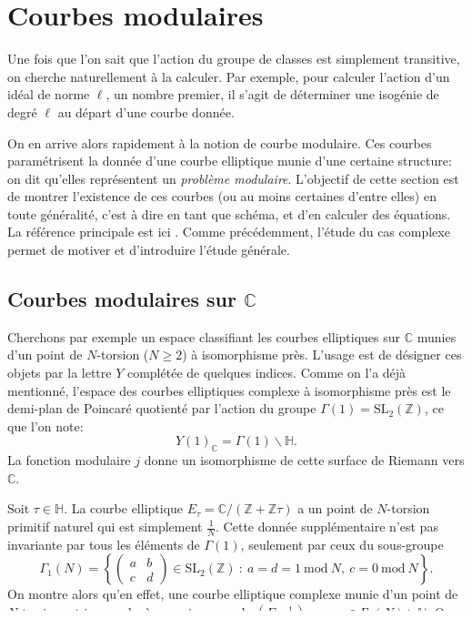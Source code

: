 \documentclass[11pt,a4paper]{article}
\newcommand{\Z}{\mathbb{Z}}
\newcommand{\C}{\mathbb{C}}
\renewcommand{\H}{\mathbb{H}}
\renewcommand{\b}{\backslash}
\renewcommand{\mod}{\ \mathrm{mod}\ }
\theoremstyle{definition}
\begin{document}
\newpage

\section{Courbes modulaires}

Une fois que l'on sait que l'action du groupe de classes est simplement transitive, on cherche naturellement à la calculer. Par exemple, pour calculer l'action d'un idéal de norme $\ell$, un nombre premier, il s'agit de déterminer une isogénie de degré $\ell$ au départ d'une courbe donnée.

On en arrive alors rapidement à la notion de courbe modulaire. Ces courbes paramétrisent la donnée d'une courbe elliptique munie d'une certaine structure: on dit qu'elles représentent un \emph{problème modulaire}. L'objectif de cette section est de montrer l'existence de ces courbes (ou au moins certaines d'entre elles) en toute généralité, c'est à dire en tant que schéma, et d'en calculer des équations. La référence principale est ici \cite{KaMa}. Comme précédemment, l'étude du cas complexe permet de motiver et d'introduire l'étude générale.


\subsection{Courbes modulaires sur $\C$}

Cherchons par exemple un espace classifiant les courbes elliptiques sur $\C$ munies d'un point de $N$-torsion ($N\geq 2$) à isomorphisme près. L'usage est de désigner ces objets par la lettre $Y$ complétée de quelques indices. Comme on l'a déjà mentionné, l'espace des courbes elliptiques complexe à isomorphisme près est le demi-plan de Poincaré quotienté par l'action du groupe $\Gamma(1) = \mathrm{SL}_2(\Z)$, ce que l'on note:
$$Y(1)_\C = \Gamma(1) \b \H.$$
La fonction modulaire $j$ donne un isomorphisme de cette surface de Riemann vers $\C$.

Soit $\tau\in \H$. La courbe elliptique $E_\tau = \C/(\Z+\Z\tau)$ a un point de $N$-torsion primitif naturel qui est simplement $\frac{1}{N}$. Cette donnée supplémentaire n'est pas invariante par tous les éléments de $\Gamma(1)$, seulement par ceux du sous-groupe
$$\Gamma_1(N) = \left\{\left(
\begin{matrix}
a & b \\
c & d
\end{matrix}
\right) \in \mathrm{SL}_2(\Z)\ :\ a = d = 1 \mod{N},\ c = 0\mod{N}\right\}.$$
On montre alors qu'en effet, une courbe elliptique complexe munie d'un point de $N$-torsion est isomorphe à un unique couple $\left(E_\tau, \frac{1}{N}\right)$ avec $\tau\in \Gamma_1(N) \b \H$. On note cela
$$Y_1(N)_\C = \Gamma_1(N) \b \H.$$
\end{document}
